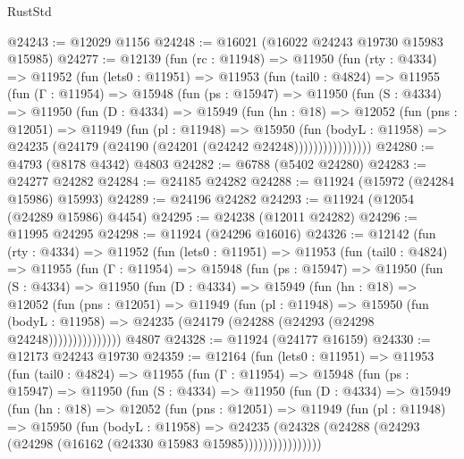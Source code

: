 \begin{lexlean}{RustStd}
\begin{coremodule}
{\begin{coremodule}
{{{{{{{{{{{{{{{{{{{{{{{{{{{{{{{{{{{{{{{{{{{{{{{{{{{{{{{{{{{{{{{{{{{{{{{{{{{{{{{{@24243 := @12029 @1156
@24248 := @16021 (@16022 @24243 @19730 @15983 @15985)
@24277 := @12139
    (fun (rc : @11948) =>
    @11950
      (fun (rty : @4334) =>
      @11952
        (fun (lets0 : @11951) =>
        @11953
          (fun (tail0 : @4824) =>
          @11955
            (fun (Γ : @11954) =>
            @15948
              (fun (ps : @15947) =>
              @11950
                (fun (S : @4334) =>
                @11950
                  (fun (D : @4334) =>
                  @15949
                    (fun (hn : @18) =>
                    @12052
                      (fun (pns : @12051) =>
                      @11949
                        (fun (pl : @11948) =>
                        @15950
                          (fun (bodyL : @11958) =>
                          @24235 (@24179 (@24190 (@24201 (@24242 @24248))))))))))))))))
@24280 := @4793 (@8178 @4342) @4803
@24282 := @6788 (@5402 @24280)
@24283 := @24277 @24282
@24284 := @24185 @24282
@24288 := @11924 (@15972 (@24284 @15986) @15993)
@24289 := @24196 @24282
@24293 := @11924 (@12054 (@24289 @15986) @4454)
@24295 := @24238 (@12011 @24282)
@24296 := @11995 @24295
@24298 := @11924 (@24296 @16016)
@24326 := @12142
    (fun (rty : @4334) =>
    @11952
      (fun (lets0 : @11951) =>
      @11953
        (fun (tail0 : @4824) =>
        @11955
          (fun (Γ : @11954) =>
          @15948
            (fun (ps : @15947) =>
            @11950
              (fun (S : @4334) =>
              @11950
                (fun (D : @4334) =>
                @15949
                  (fun (hn : @18) =>
                  @12052
                    (fun (pns : @12051) =>
                    @11949
                      (fun (pl : @11948) =>
                      @15950
                        (fun (bodyL : @11958) =>
                        @24235 (@24179 (@24288 (@24293 (@24298 @24248)))))))))))))))
    @4807
@24328 := @11924 (@24177 @16159)
@24330 := @12173 @24243 @19730
@24359 := @12164
    (fun (lets0 : @11951) =>
    @11953
      (fun (tail0 : @4824) =>
      @11955
        (fun (Γ : @11954) =>
        @15948
          (fun (ps : @15947) =>
          @11950
            (fun (S : @4334) =>
            @11950
              (fun (D : @4334) =>
              @15949
                (fun (hn : @18) =>
                @12052
                  (fun (pns : @12051) =>
                  @11949
                    (fun (pl : @11948) =>
                    @15950
                      (fun (bodyL : @11958) =>
                      @24235
                        (@24328
                          (@24288 (@24293 (@24298 (@16162 (@24330 @15983 @15985))))))))))))))))
}}}}}}}}}}}}}}}}}}}}}}}}}}}}}}}}}}}}}}}}}}}}}}}}}}}}}}}}}}}}}}}}}}}}}}}}}}}}}}}}
\end{coremodule}}
\end{coremodule}
\end{lexlean}
